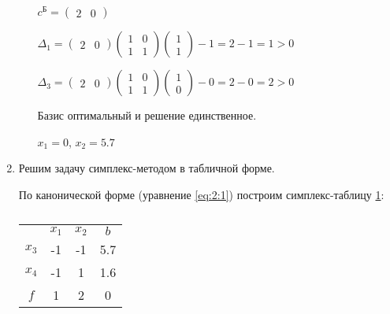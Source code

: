 \begin{enumerate}
\begin{enumerate}
	$c^\text{Б} = \begin{pmatrix}
		2 & 0
	\end{pmatrix}$	
	
	$\Delta_1 = \begin{pmatrix}
		2 & 0
	\end{pmatrix}
	\begin{pmatrix}
		1 & 0 \\ 1 & 1
	\end{pmatrix}
	\begin{pmatrix}
		1 \\ 1
	\end{pmatrix}
	- 1 = 2 - 1 = 1 > 0
	$
	
	$\Delta_3 = \begin{pmatrix}
		2 & 0
	\end{pmatrix}
	\begin{pmatrix}
		1 & 0 \\ 1 & 1
	\end{pmatrix}
	\begin{pmatrix}
		1 \\ 0
	\end{pmatrix}
	- 0 = 2 - 0 = 2 > 0$	
	
	Базис оптимальный и решение единственное.	
	
	$x_1 = 0$, $x_2 = 5.7$	
	
\end{enumerate}

\item Решим задачу симплекс-методом в табличной форме.

По канонической форме (уравнение \ref{eq:2:1}) построим симплекс-таблицу \ref{tab:simplex:1}:

\begin{table}[H]
\begin{center}
	\caption{}
	\label{tab:simplex:1}
	\def\tabcolsep{18pt}
	\def\arraystretch{1.5}
	\fontsize{13}{14}\selectfont
	\begin{tabular}{|c|c||c||c|}
	\hline
	 & $x_1$ & $x_2$ & $b$ \\ 
	\hhline{|=|=|=|=|} 
	$x_3$ & -1 & \cellcolor{pink} -1 & 5.7 \\ 
	\hhline{|=|=|=|=|} 
	$x_4$ & -1 & 1 & 1.6 \\ 
	\hline 
	$f$ & 1 & 2 & 0 \\ 
	\hline 
	\end{tabular} 
\end{center}
\end{table}


\end{enumerate}
